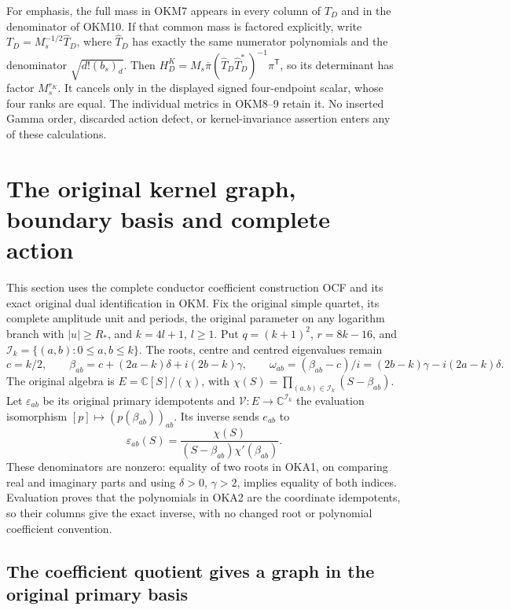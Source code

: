 \documentclass[11pt,a4paper]{article}
\begin{document}
For emphasis, the full mass in OKM7 appears in every column of
$T_D$ and in the denominator of OKM10. If that common mass is
factored explicitly, write $T_D=M_s^{-1/2}\widehat T_D$, where
$\widehat T_D$ has exactly the same numerator polynomials and
the denominator $\sqrt{d!(b_s)_d}$. Then
$H_D^K=M_s\overline\pi(\widehat T_D\widehat T_D^*)^{-1}
\pi^{\mathsf T}$, so its determinant has factor $M_s^{r_K}$.
It cancels only in the displayed signed four-endpoint scalar,
whose four ranks are equal. The individual metrics in OKM8--9
retain it. No inserted Gamma order, discarded action defect, or
kernel-invariance assertion enters any of these calculations.


\clearpage
\section{The original kernel graph, boundary basis and complete action}
\label{sec:OKA}

This section uses the complete conductor coefficient construction OCF
and its exact original dual identification in OKM. Fix the original
simple quartet, its complete amplitude unit and periods, the original
parameter on any logarithm branch with $|u|\geq R_*$, and
$k=4l+1$, $l\geq1$. Put $q=(k+1)^2$, $r=8k-16$, and
$\mathcal I_k=\{(a,b):0\leq a,b\leq k\}$. The roots, centre and
centred eigenvalues remain
\[
 c=k/2,\qquad
 \beta_{ab}=c+(2a-k)\delta+i(2b-k)\gamma,\qquad
 \omega_{ab}=(\beta_{ab}-c)/i
             =(2b-k)\gamma-i(2a-k)\delta.
 \tag{OKA1}
\]
The original algebra is $E=\mathbb C[S]/(\chi)$, with
$\chi(S)=\prod_{(a,b)\in\mathcal I_k}(S-\beta_{ab})$.
Let $\varepsilon_{ab}$ be its original primary idempotents and
$\mathcal V:E\to\mathbb C^{\mathcal I_k}$ the evaluation
isomorphism $[p]\mapsto(p(\beta_{ab}))_{ab}$. Its inverse sends
$e_{ab}$ to
\[
 \varepsilon_{ab}(S)
 =\frac{\chi(S)}{(S-\beta_{ab})\chi'(\beta_{ab})}.
 \tag{OKA2}
\]
These denominators are nonzero: equality of two roots in OKA1,
on comparing real and imaginary parts and using $\delta>0$,
$\gamma>2$, implies equality of both indices. Evaluation proves
that the polynomials in OKA2 are the coordinate idempotents,
so their columns give the exact inverse, with no changed root
or polynomial coefficient convention.

\subsection{The coefficient quotient gives a graph in the original primary basis}
\end{document}
